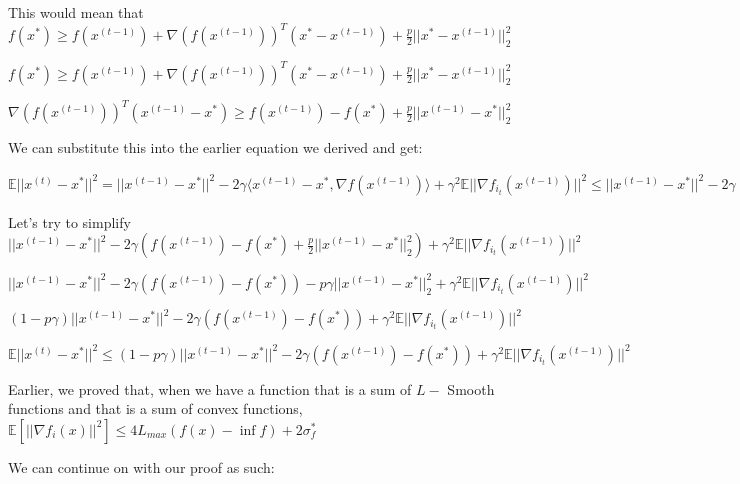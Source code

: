 This would mean that $f(x^*) \geq f(x^{(t - 1)}) + \nabla(f(x^{(t - 1)}))^T (x^* - x^{(t - 1)}) + \frac{p}{2} ||x^* - x^{(t - 1)}||^2_2$ \newline 


$f(x^*) \geq f(x^{(t - 1)}) + \nabla(f(x^{(t - 1)}))^T (x^* - x^{(t - 1)}) + \frac{p}{2} ||x^* - x^{(t - 1)}||^2_2$ \newline 


$\nabla(f(x^{(t - 1)}))^T (x^{(t - 1)} - x^*) \geq f(x^{(t - 1)}) - f(x^*) + \frac{p}{2} ||x^{(t - 1)} - x^*||^2_2$ \newline 

We can substitute this into the earlier equation we derived and get: \newline 

$\mathbb{E}||x^{(t)} - x^*||^2 = ||x^{(t - 1)} - x^*||^2 - 2\gamma \langle x^{(t - 1)} - x^*,  \nabla f(x^{(t - 1)})\rangle + \gamma^2 \mathbb{E} ||\nabla f_{i_t}(x^{(t - 1)})||^2 \leq ||x^{(t - 1)} - x^*||^2 - 2\gamma (f(x^{(t - 1)}) - f(x^*) + \frac{p}{2} ||x^{(t - 1)} - x^*||^2_2) + \gamma^2 \mathbb{E} ||\nabla f_{i_t}(x^{(t - 1)})||^2$ \newline 

Let's try to simplify $||x^{(t - 1)} - x^*||^2 - 2\gamma (f(x^{(t - 1)}) - f(x^*) + \frac{p}{2} ||x^{(t - 1)} - x^*||^2_2) + \gamma^2 \mathbb{E} ||\nabla f_{i_t}(x^{(t - 1)})||^2$ \newline 

$||x^{(t - 1)} - x^*||^2 - 2\gamma (f(x^{(t - 1)}) - f(x^*)) - p \gamma ||x^{(t - 1)} - x^*||^2_2 + \gamma^2 \mathbb{E} ||\nabla f_{i_t}(x^{(t - 1)})||^2$ \newline 


$(1 - p \gamma)||x^{(t - 1)} - x^*||^2 - 2\gamma (f(x^{(t - 1)}) - f(x^*))+ \gamma^2 \mathbb{E} ||\nabla f_{i_t}(x^{(t - 1)})||^2$ \newline 

$\mathbb{E}||x^{(t)} - x^*||^2  \leq (1 - p \gamma)||x^{(t - 1)} - x^*||^2 - 2\gamma (f(x^{(t - 1)}) - f(x^*))+ \gamma^2 \mathbb{E} ||\nabla f_{i_t}(x^{(t - 1)})||^2$ \newline 

Earlier, we proved that, when we have a function that is a sum of $L-$ Smooth functions and that is a sum of convex functions, $\mathbb{E}[||\nabla f_i(x)||^2] \leq 4L_{max} (f(x) - \inf f) + 2 \sigma_f^*$ \newline 

We can continue on with our proof as such: \newline 


